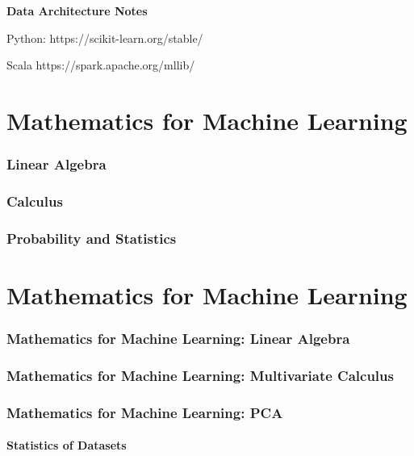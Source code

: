 \documentclass[a4paper, 11pt]{book}
\begin{document}
    \begin{titlepage}
        \centering
        \vspace*{2in}
        \Huge \textbf{Data Architecture Notes}
    \end{titlepage}

    \setcounter{section}{0}

    \newpage

    \tableofcontents
    \newpage

    \listoffigures
    \newpage

    Python:
    https://scikit-learn.org/stable/

    Scala
    https://spark.apache.org/mllib/


    \part{Mathematics for Machine Learning} %
    \section{Linear Algebra}
    \section{Calculus}
    \section{Probability and Statistics}


    \part{Mathematics for Machine Learning}
    \section{Mathematics for Machine Learning: Linear Algebra}
    \section{Mathematics for Machine Learning: Multivariate Calculus}
    \section{Mathematics for Machine Learning: PCA}
    \subsection{Statistics of Datasets}
\end{document}
